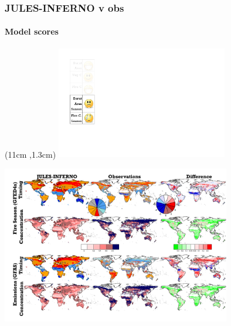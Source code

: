 \begin{frame}[label = kelley2013Datasets]
	\frametitle{JULES-INFERNO v obs}
	\framesubtitle{Model scores}
	
	\begin{textblock*}{8cm}(11cm ,1.3cm)
		\includegraphics[width=7.5cm]{images/Smileys/BAFireCseason.png}
	\end{textblock*}
	
	\includegraphics[width=10cm]{images/julesPerformance/FireMapsSeason.png}
	
\end{frame}

%	

